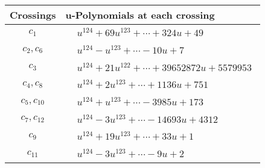 \documentclass[1p]{elsarticle_modified}
\theoremstyle{definition}
\begin{document}
\begin{tabular}{m{50pt}|m{274pt}}
Crossings & \hspace{64pt}u-Polynomials at each crossing \\
\hline $$\begin{aligned}c_{1}\end{aligned}$$&$\begin{aligned}
&u^{124}+69 u^{123}+\cdots+324 u+49
\end{aligned}$\\
\hline $$\begin{aligned}c_{2},c_{6}\end{aligned}$$&$\begin{aligned}
&u^{124}- u^{123}+\cdots-10 u+7
\end{aligned}$\\
\hline $$\begin{aligned}c_{3}\end{aligned}$$&$\begin{aligned}
&u^{124}+21 u^{122}+\cdots+39652872 u+5579953
\end{aligned}$\\
\hline $$\begin{aligned}c_{4},c_{8}\end{aligned}$$&$\begin{aligned}
&u^{124}+2 u^{123}+\cdots+1136 u+751
\end{aligned}$\\
\hline $$\begin{aligned}c_{5},c_{10}\end{aligned}$$&$\begin{aligned}
&u^{124}+u^{123}+\cdots-3985 u+173
\end{aligned}$\\
\hline $$\begin{aligned}c_{7},c_{12}\end{aligned}$$&$\begin{aligned}
&u^{124}-3 u^{123}+\cdots-14693 u+4312
\end{aligned}$\\
\hline $$\begin{aligned}c_{9}\end{aligned}$$&$\begin{aligned}
&u^{124}+19 u^{123}+\cdots+33 u+1
\end{aligned}$\\
\hline $$\begin{aligned}c_{11}\end{aligned}$$&$\begin{aligned}
&u^{124}-3 u^{123}+\cdots-9 u+2
\end{aligned}$\\
\hline
\end{tabular}\\~\\
\end{document}
